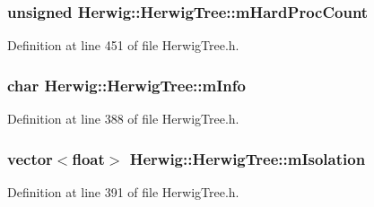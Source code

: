 \subsubsection[{\texorpdfstring{m\+Hard\+Proc\+Count}{mHardProcCount}}]{\setlength{\rightskip}{0pt plus 5cm}unsigned Herwig\+::\+Herwig\+Tree\+::m\+Hard\+Proc\+Count\hspace{0.3cm}{\ttfamily [protected]}}\hypertarget{class_herwig_1_1_herwig_tree_a211506013383c5057459219813924383}{}\label{class_herwig_1_1_herwig_tree_a211506013383c5057459219813924383}


Definition at line 451 of file Herwig\+Tree.\+h.

\subsubsection[{\texorpdfstring{m\+Info}{mInfo}}]{\setlength{\rightskip}{0pt plus 5cm}char Herwig\+::\+Herwig\+Tree\+::m\+Info\hspace{0.3cm}{\ttfamily [protected]}}\hypertarget{class_herwig_1_1_herwig_tree_ac49d274539b787810d87c13984d1679f}{}\label{class_herwig_1_1_herwig_tree_ac49d274539b787810d87c13984d1679f}


Definition at line 388 of file Herwig\+Tree.\+h.

\subsubsection[{\texorpdfstring{m\+Isolation}{mIsolation}}]{\setlength{\rightskip}{0pt plus 5cm}vector$<$float$>$ Herwig\+::\+Herwig\+Tree\+::m\+Isolation\hspace{0.3cm}{\ttfamily [protected]}}\hypertarget{class_herwig_1_1_herwig_tree_a216647b55088bd7af117564be968e4aa}{}\label{class_herwig_1_1_herwig_tree_a216647b55088bd7af117564be968e4aa}


Definition at line 391 of file Herwig\+Tree.\+h.

